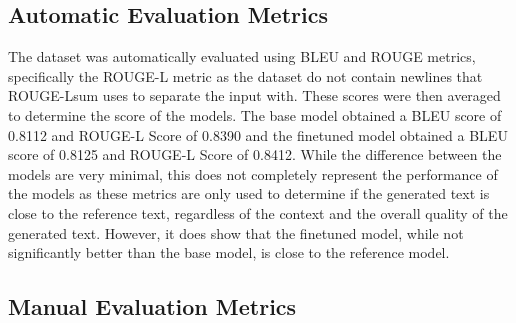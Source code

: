 \subsection{Automatic Evaluation Metrics}
The dataset was automatically evaluated using BLEU and ROUGE metrics, specifically the ROUGE-L metric as the dataset do not contain newlines that ROUGE-Lsum uses to separate the input with. These scores were then averaged to determine the score of the models. The base model obtained a BLEU score of 0.8112 and ROUGE-L Score of 0.8390 and the finetuned model obtained a BLEU score of 0.8125 and ROUGE-L Score of 0.8412. While the difference between the models are very minimal, this does not completely represent the performance of the models as these metrics are only used to determine if the generated text is close to the reference text, regardless of the context and the overall quality of the generated text. However, it does show that the finetuned model, while not significantly better than the base model, is close to the reference model.

\subsection{Manual Evaluation Metrics}
